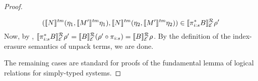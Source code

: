 \begin{proof}
\begin{description}
\begin{displaymath}
      (\llbracket N \rrbracket^{\mathit{tm}}(\eta_1,\llbracket M' \rrbracket^{\mathit{tm}}\eta_1),
       \llbracket N \rrbracket^{\mathit{tm}}(\eta_2,\llbracket M' \rrbracket^{\mathit{tm}}\eta_2)) \in \llbracket \pi_{i\mathord:s}^*B \rrbracket^{\mathcal{R}}_{\mathcal{E}}{\rho'}
    \end{displaymath}
    Now, by ,
    $\llbracket \pi_{i\mathord:s}^*B \rrbracket^{\mathcal{R}}_{\mathcal{E}}{\rho'} =
    \llbracket B \rrbracket^{\mathcal{R}}_{\mathcal{E}}{(\rho' \circ \pi_{i\mathord:s})} =
    \llbracket B \rrbracket^{\mathcal{R}}_{\mathcal{E}}{\rho}$. By the definition of the
    index-erasure semantics of $\mathrm{unpack}$ terms, we are done.
  \end{description}
  The remaining cases are standard for proofs of the fundamental lemma
  of logical relations for simply-typed systems.
\end{proof}

